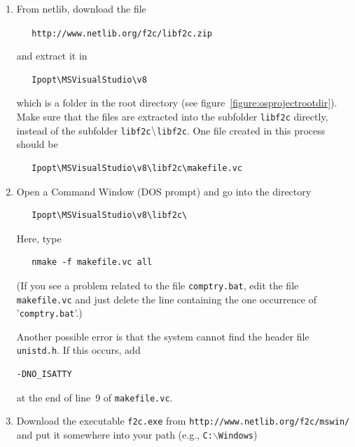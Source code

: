 \documentclass[11pt]{article}
\renewcommand{\_}{{\char"5F}}
\renewcommand{\{}{{\char"7B}}
\renewcommand{\}}{{\char"7D}}
\renewcommand{\^}{{\char"0D}}
\renewcommand{\'}{{\char"0D}}
\newcommand{\UrlFToCBin}{http://www.netlib.org/f2c/mswin/}
\newcommand{\UrlFToCZip}{http://www.netlib.org/f2c/libf2c.zip}
\begin{document}
\begin{enumerate}


\item{} From netlib, download the file


{\tt\ \ \ \UrlFToCZip}

   and extract it in

\begin{verbatim}
   Ipopt\MSVisualStudio\v8
\end{verbatim}


 which is a folder in the root directory (see figure~\ref{figure:osprojectrootdir}). Make sure that the files
are extracted into the subfolder {\tt libf2c} directly, instead of the subfolder {\tt libf2c$\tt\backslash$libf2c}.
One file created in this process should be

\begin{verbatim}
   Ipopt\MSVisualStudio\v8\libf2c\makefile.vc
\end{verbatim}


\item{} Open a Command Window (DOS prompt) and go into the directory

\begin{verbatim}
   Ipopt\MSVisualStudio\v8\libf2c\
\end{verbatim}

   Here, type

\begin{verbatim}
   nmake -f makefile.vc all
\end{verbatim}

   (If you see a problem related to the file {\tt comptry.bat}, edit the
   file {\tt makefile.vc} and just delete the line containing the one occurrence of
   '{\tt comptry.bat}'.)

Another possible error is that the system cannot find the header file {\tt unistd.h}.
If this occurs, add

\begin{verbatim}
-DNO_ISATTY
\end{verbatim}

at the end of line~9 of {\tt makefile.vc}.

\item{} Download the executable {\tt f2c.exe} from {\tt\UrlFToCBin}
and put it somewhere into your path
   (e.g., {\tt C:$\backslash$Windows})


\end{enumerate}
\end{document}
